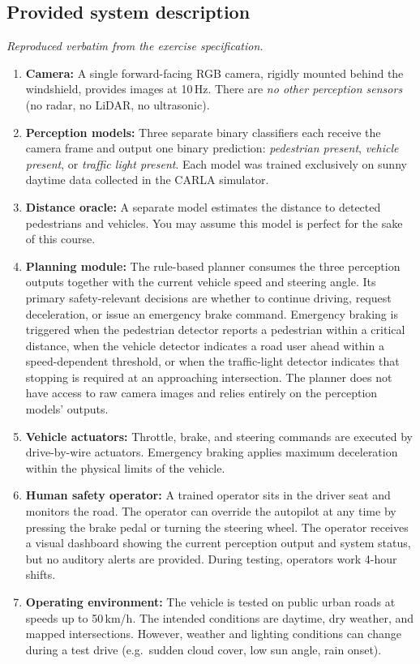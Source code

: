 \documentclass[a4paper,12pt]{article}
\begin{document}
\subsection{Provided system description}

\emph{Reproduced verbatim from the exercise specification.}

{\small
\begin{enumerate}[itemsep=1pt,topsep=2pt]
  \item \textbf{Camera:} A single forward-facing RGB camera, rigidly mounted behind the windshield, provides images at 10\,Hz. There are \emph{no other perception sensors} (no radar, no LiDAR, no ultrasonic).
  \item \textbf{Perception models:} Three separate binary classifiers each receive the camera frame and output one binary prediction: \emph{pedestrian present}, \emph{vehicle present}, or \emph{traffic light present}. Each model was trained exclusively on sunny daytime data collected in the CARLA simulator.
  \item \textbf{Distance oracle:} A separate model estimates the distance to detected pedestrians and
    vehicles. You may assume this model is perfect for the sake of this course.
  \item \textbf{Planning module:} The rule-based planner consumes the three perception outputs together with the current vehicle speed and steering angle. Its primary safety-relevant decisions are whether to continue driving, request deceleration, or issue an emergency brake command. Emergency braking is triggered when the pedestrian detector reports a pedestrian within a critical distance, when the vehicle detector indicates a road user ahead within a speed-dependent
    threshold, or when the traffic-light detector indicates that stopping is required at an approaching intersection. The planner does not have access to raw camera images and relies entirely on the perception models' outputs.
  \item \textbf{Vehicle actuators:} Throttle, brake, and steering commands are executed by drive-by-wire actuators. Emergency braking applies maximum deceleration within the physical limits of the vehicle.
  \item \textbf{Human safety operator:} A trained operator sits in the driver seat and monitors the road. The operator can override the autopilot at any time by pressing the brake pedal or turning the steering wheel. The operator receives a visual dashboard showing the current perception output and system status, but no auditory alerts are provided. During testing, operators work 4-hour shifts.
  \item \textbf{Operating environment:} The vehicle is tested on public urban roads at speeds up to 50\,km/h. The intended conditions are daytime, dry weather, and mapped intersections. However, weather and lighting conditions can change during a test drive (e.g.\ sudden cloud cover, low sun angle, rain onset).
\end{enumerate}}
\end{document}
